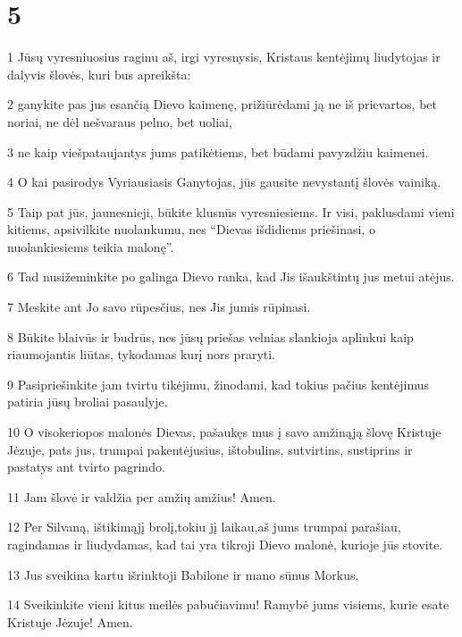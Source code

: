 \chapter{5}


\par 1 Jūsų vyresniuosius raginu aš, irgi vyresnysis, Kristaus kentėjimų liudytojas ir dalyvis šlovės, kuri bus apreikšta: 
\par 2 ganykite pas jus esančią Dievo kaimenę, prižiūrėdami ją ne iš prievartos, bet noriai, ne dėl nešvaraus pelno, bet uoliai, 
\par 3 ne kaip viešpataujantys jums patikėtiems, bet būdami pavyzdžiu kaimenei. 
\par 4 O kai pasirodys Vyriausiasis Ganytojas, jūs gausite nevystantį šlovės vainiką. 
\par 5 Taip pat jūs, jaunesnieji, būkite klusnūs vyresniesiems. Ir visi, paklusdami vieni kitiems, apsivilkite nuolankumu, nes “Dievas išdidiems priešinasi, o nuolankiesiems teikia malonę”. 
\par 6 Tad nusižeminkite po galinga Dievo ranka, kad Jis išaukštintų jus metui atėjus. 
\par 7 Meskite ant Jo savo rūpesčius, nes Jis jumis rūpinasi. 
\par 8 Būkite blaivūs ir budrūs, nes jūsų priešas velnias slankioja aplinkui kaip riaumojantis liūtas, tykodamas kurį nors praryti. 
\par 9 Pasipriešinkite jam tvirtu tikėjimu, žinodami, kad tokius pačius kentėjimus patiria jūsų broliai pasaulyje. 
\par 10 O visokeriopos malonės Dievas, pašaukęs mus į savo amžinąją šlovę Kristuje Jėzuje, pats jus, trumpai pakentėjusius, ištobulins, sutvirtins, sustiprins ir pastatys ant tvirto pagrindo. 
\par 11 Jam šlovė ir valdžia per amžių amžius! Amen. 
\par 12 Per Silvaną, ištikimąjį brolį,­tokiu jį laikau,­aš jums trumpai parašiau, ragindamas ir liudydamas, kad tai yra tikroji Dievo malonė, kurioje jūs stovite. 
\par 13 Jus sveikina kartu išrinktoji Babilone ir mano sūnus Morkus. 
\par 14 Sveikinkite vieni kitus meilės pabučiavimu! Ramybė jums visiems, kurie esate Kristuje Jėzuje! Amen.


